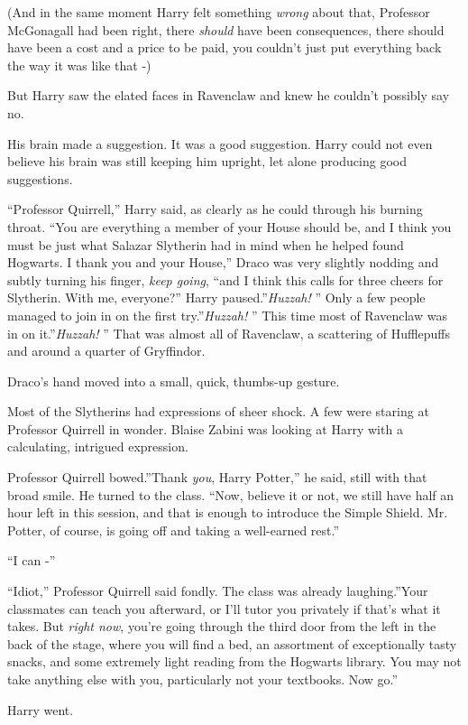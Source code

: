 (And in the same moment Harry felt something \emph{wrong} about that,
Professor McGonagall had been right, there \emph{should} have been
consequences, there should have been a cost and a price to be paid, you
couldn't just put everything back the way it was like that -)

But Harry saw the elated faces in Ravenclaw and knew he couldn't
possibly say no.

His brain made a suggestion. It was a good suggestion. Harry could not
even believe his brain was still keeping him upright, let alone
producing good suggestions.

``Professor Quirrell,'' Harry said, as clearly as he could through his
burning throat. ``You are everything a member of your House should be,
and I think you must be just what Salazar Slytherin had in mind when he
helped found Hogwarts. I thank you and your House,'' Draco was very
slightly nodding and subtly turning his finger, \emph{keep going}, ``and
I think this calls for three cheers for Slytherin. With me, everyone?''
Harry paused.''\emph{Huzzah!} '' Only a few people managed to join in on
the first try.''\emph{Huzzah!} '' This time most of Ravenclaw was in on
it.''\emph{Huzzah!} '' That was almost all of Ravenclaw, a scattering of
Hufflepuffs and around a quarter of Gryffindor.

Draco's hand moved into a small, quick, thumbs-up gesture.

Most of the Slytherins had expressions of sheer shock. A few were
staring at Professor Quirrell in wonder. Blaise Zabini was looking at
Harry with a calculating, intrigued expression.

Professor Quirrell bowed.''Thank \emph{you}, Harry Potter,'' he said,
still with that broad smile. He turned to the class. ``Now, believe it
or not, we still have half an hour left in this session, and that is
enough to introduce the Simple Shield. Mr. Potter, of course, is going
off and taking a well-earned rest.''

``I can -''

``Idiot,'' Professor Quirrell said fondly. The class was already
laughing.''Your classmates can teach you afterward, or I'll tutor you
privately if that's what it takes. But \emph{right now}, you're going
through the third door from the left in the back of the stage, where you
will find a bed, an assortment of exceptionally tasty snacks, and some
extremely light reading from the Hogwarts library. You may not take
anything else with you, particularly not your textbooks. Now go.''

Harry went.
